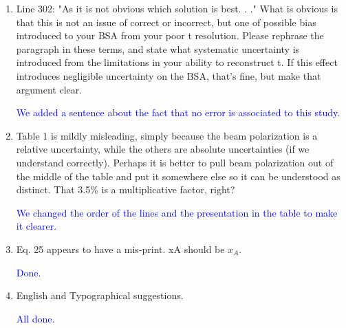 \documentclass[a4paper,11pt,twoside]{article}
\begin{document}
\begin{enumerate}
\item  Line 302: "As it is not obvious which solution is best. . ."
What is obvious is that this is not an issue of correct or incorrect, but one of possible bias introduced to your
BSA from your poor t resolution. Please rephrase the paragraph in these terms, and state what systematic
uncertainty is introduced from the limitations in your ability to reconstruct t. If this effect introduces negligible
uncertainty on the BSA, that's fine, but make that argument clear.

   \textcolor{blue}{We added a sentence about the fact that no error is associated to 
this study.}

\item  Table 1 is mildly misleading, simply because the beam polarization is a relative uncertainty, while the others
are absolute uncertainties (if we understand correctly). Perhaps it is better to pull beam polarization out of
the middle of the table and put it somewhere else so it can be understood as distinct.
That 3.5\% is a multiplicative factor, right?

   \textcolor{blue}{We changed the order of the lines and the presentation in the table to make it clearer.}

\item  Eq. 25 appears to have a mis-print. xA should be $x_A$.

   \textcolor{blue}{Done.}

\item  English and Typographical suggestions.

   \textcolor{blue}{All done.}

\end{enumerate}
\end{document}
